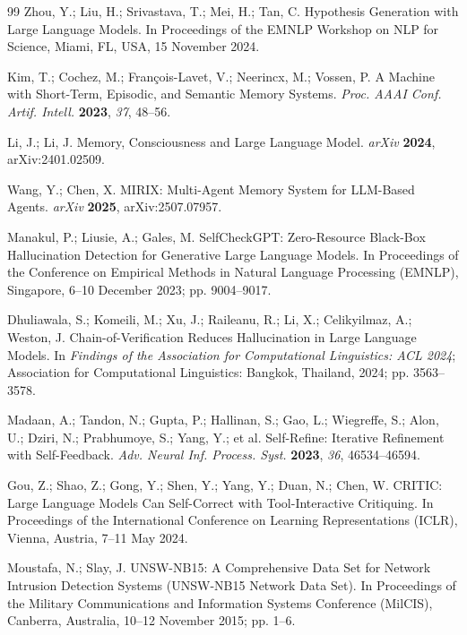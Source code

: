 \documentclass[10pt,a4paper,onecolumn]{article}
\theoremstyle{definition}
\theoremstyle{remark}
\begin{document}
\begin{thebibliography}{99}
Zhou, Y.; Liu, H.; Srivastava, T.; Mei, H.; Tan, C. Hypothesis Generation with Large Language Models. In Proceedings of the EMNLP Workshop on NLP for Science, Miami, FL, USA, 15 November 2024.

Kim, T.; Cochez, M.; Fran\c{c}ois-Lavet, V.; Neerincx, M.; Vossen, P. A Machine with Short-Term, Episodic, and Semantic Memory Systems. \emph{Proc. AAAI Conf. Artif. Intell.} \textbf{2023}, \emph{37}, 48--56.

Li, J.; Li, J. Memory, Consciousness and Large Language Model. \emph{arXiv} \textbf{2024}, arXiv:2401.02509.

Wang, Y.; Chen, X. MIRIX: Multi-Agent Memory System for LLM-Based Agents. \emph{arXiv} \textbf{2025}, arXiv:2507.07957.

Manakul, P.; Liusie, A.; Gales, M. SelfCheckGPT: Zero-Resource Black-Box Hallucination Detection for Generative Large Language Models. In Proceedings of the Conference on Empirical Methods in Natural Language Processing (EMNLP), Singapore, 6--10 December 2023; pp. 9004--9017.

Dhuliawala, S.; Komeili, M.; Xu, J.; Raileanu, R.; Li, X.; Celikyilmaz, A.; Weston, J. Chain-of-Verification Reduces Hallucination in Large Language Models. In \emph{Findings of the Association for Computational Linguistics: ACL 2024}; Association for Computational Linguistics: Bangkok, Thailand, 2024; pp. 3563--3578.

Madaan, A.; Tandon, N.; Gupta, P.; Hallinan, S.; Gao, L.; Wiegreffe, S.; Alon, U.; Dziri, N.; Prabhumoye, S.; Yang, Y.; et al. Self-Refine: Iterative Refinement with Self-Feedback. \emph{Adv. Neural Inf. Process. Syst.} \textbf{2023}, \emph{36}, 46534--46594.

Gou, Z.; Shao, Z.; Gong, Y.; Shen, Y.; Yang, Y.; Duan, N.; Chen, W. CRITIC: Large Language Models Can Self-Correct with Tool-Interactive Critiquing. In Proceedings of the International Conference on Learning Representations (ICLR), Vienna, Austria, 7--11 May 2024.

Moustafa, N.; Slay, J. UNSW-NB15: A Comprehensive Data Set for Network Intrusion Detection Systems (UNSW-NB15 Network Data Set). In Proceedings of the Military Communications and Information Systems Conference (MilCIS), Canberra, Australia, 10--12 November 2015; pp. 1--6.
\end{thebibliography}
\end{document}
